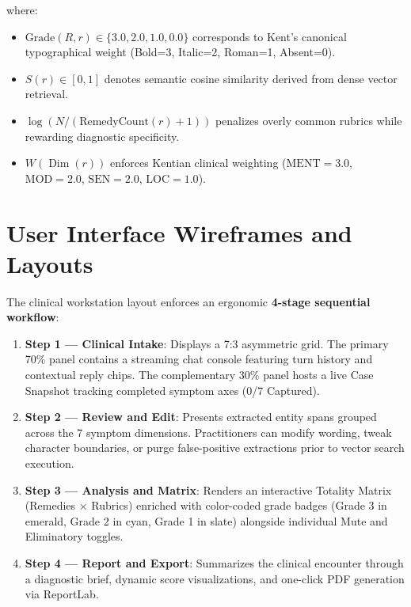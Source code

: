where:
\begin{itemize}
  \item $\text{Grade}(R, r) \in \{3.0, 2.0, 1.0, 0.0\}$ corresponds to Kent's canonical typographical weight (Bold=3, Italic=2, Roman=1, Absent=0).
  \item $S(r) \in [0, 1]$ denotes semantic cosine similarity derived from dense vector retrieval.
  \item $\log(N / (\text{RemedyCount}(r) + 1))$ penalizes overly common rubrics while rewarding diagnostic specificity.
  \item $W(\operatorname{Dim}(r))$ enforces Kentian clinical weighting ($\text{MENT} = 3.0$, $\text{MOD} = 2.0$, $\text{SEN} = 2.0$, $\text{LOC} = 1.0$).
\end{itemize}


\section{User Interface Wireframes and Layouts}

The clinical workstation layout enforces an ergonomic \textbf{4-stage sequential workflow}:

\begin{enumerate}
  \item \textbf{Step 1 --- Clinical Intake}: Displays a 7:3 asymmetric grid. The primary 70\% panel contains a streaming chat console featuring turn history and contextual reply chips. The complementary 30\% panel hosts a live Case Snapshot tracking completed symptom axes (0/7 Captured).
  \item \textbf{Step 2 --- Review and Edit}: Presents extracted entity spans grouped across the 7 symptom dimensions. Practitioners can modify wording, tweak character boundaries, or purge false-positive extractions prior to vector search execution.
  \item \textbf{Step 3 --- Analysis and Matrix}: Renders an interactive Totality Matrix (Remedies $\times$ Rubrics) enriched with color-coded grade badges (Grade 3 in emerald, Grade 2 in cyan, Grade 1 in slate) alongside individual Mute and Eliminatory toggles.
  \item \textbf{Step 4 --- Report and Export}: Summarizes the clinical encounter through a diagnostic brief, dynamic score visualizations, and one-click PDF generation via ReportLab.
\end{enumerate}
